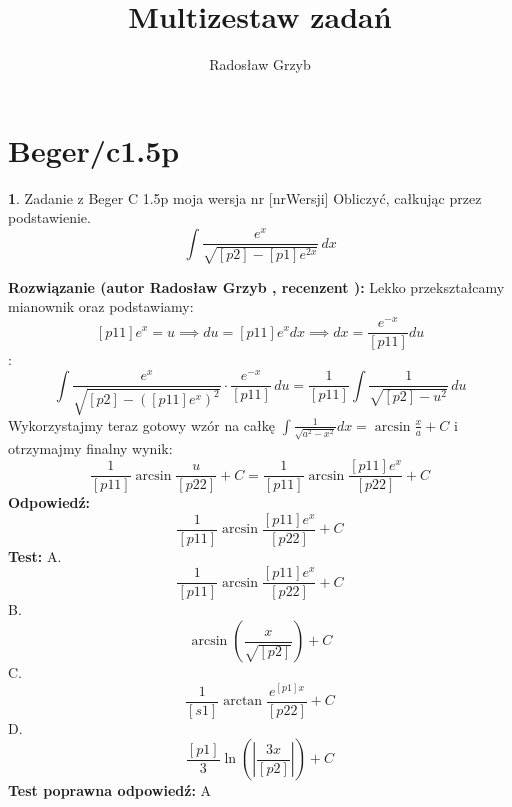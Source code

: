 \documentclass[12pt, a4paper]{article}
\title{Multizestaw zadań}
\author{Radosław Grzyb}
\date{}
\theoremstyle{definition} %
\newtheorem{zad}{}
\newcommand{\kategoria}[1]{\section{#1}} %
\newcommand{\zadStart}[1]{\begin{zad}#1\newline} %
\newcommand{\zadStop}{\end{zad}}   %
\newcommand{\rozwStart}[2]{\noindent \textbf{Rozwiązanie (autor #1 , recenzent #2): }\newline} %
\newcommand{\rozwStop}{\newline}                                            %
\newcommand{\odpStart}{\noindent \textbf{Odpowiedź:}\newline}    %
\newcommand{\odpStop}{\newline}                                             %
\newcommand{\testStart}{\noindent \textbf{Test:}\newline} %
\newcommand{\testStop}{\newline} %
\newcommand{\kluczStart}{\noindent \textbf{Test poprawna odpowiedź:}\newline} %
\newcommand{\kluczStop}{\newline} %
\begin{document}
\maketitle
\kategoria{Beger/c1.5p}
\zadStart{Zadanie z Beger C 1.5p moja wersja nr [nrWersji]}
Obliczyć, całkując przez podstawienie.
$$\int \frac{e^{x}}{\sqrt{[p2]-[p1]e^{2x}}} \,dx$$
\zadStop
\rozwStart{Radosław Grzyb}{}
Lekko przekształcamy mianownik oraz podstawiamy:
$$[p11]e^{x}=u \implies du=[p11]e^{x}dx\implies dx=\frac{e^{-x}}{[p11]}du$$:
$$\int \frac{e^{x}}{\sqrt{[p2]-([p11]e^{x})^{2}}}\cdot\frac{e^{-x}}{[p11]}\,du=\frac{1}{[p11]}\int \frac{1}{\sqrt{[p2]-u^{2}}} \,du$$
Wykorzystajmy teraz gotowy wzór na całkę $\int\frac{1}{\sqrt{a^2-x^2}}dx=\arcsin\frac{x}{a}+C$ i otrzymajmy finalny wynik:
$$\frac{1}{[p11]}\arcsin\frac{u}{[p22]}+C=\frac{1}{[p11]}\arcsin\frac{[p11]e^{x}}{[p22]}+C$$
\rozwStop
\odpStart
$$\frac{1}{[p11]}\arcsin\frac{[p11]e^{x}}{[p22]}+C$$
\odpStop
\testStart
A.$$\frac{1}{[p11]}\arcsin\frac{[p11]e^{x}}{[p22]}+C$$
B.$$\arcsin(\frac{x}{\sqrt{[p2]}})+C$$
C.$$\frac{1}{[s1]}\arctan\frac{e^{[p1]x}}{[p22]}+C$$
D.$$\frac{[p1]}{3}\ln(|\frac{3x}{[p2]}|)+C$$
\testStop
\kluczStart
A
\kluczStop
\end{document}
